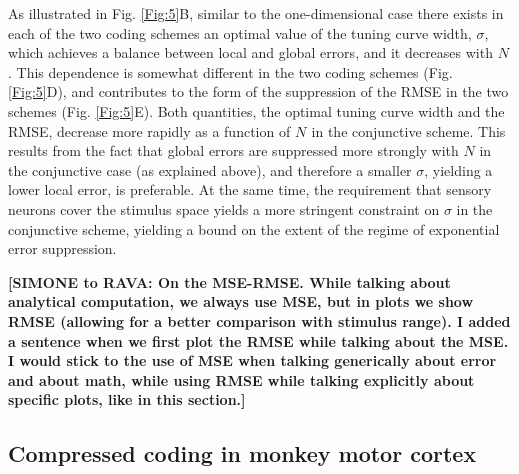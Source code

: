 \documentclass[a4paper]{article}%
\begin{document}
As illustrated in Fig. \ref{Fig:5}B, similar to the one-dimensional case there
exists in each of the two coding schemes an optimal value of the tuning curve
width, $\sigma$, which achieves a balance between local and global errors, and
it decreases with $N$. This dependence is somewhat different in the two coding
schemes (Fig. \ref{Fig:5}D), and contributes to the form of the suppression of
the RMSE in the two schemes (Fig. \ref{Fig:5}E). Both quantities, the optimal
tuning curve width and the RMSE, decrease more rapidly as a function of
$N\,\ $in the conjunctive scheme. This results from the fact that global errors
are suppressed more strongly with \thinspace$N$ in the conjunctive case (as
explained above), and therefore a smaller $\sigma$, yielding a lower local
error, is preferable. At the same time, the requirement that sensory neurons
cover the stimulus space yields a more stringent constraint on $\sigma$ in the
conjunctive scheme, yielding a bound on the extent of the regime of
exponential error suppression. 

\textbf{[SIMONE to RAVA: On the MSE-RMSE. While talking about analytical computation, we always use MSE, but in plots we show RMSE (allowing for a better comparison with stimulus range). I added a sentence when we first plot the RMSE while talking about the MSE. I would stick to the use of MSE when talking generically about error and about math, while using RMSE while talking explicitly about specific plots, like in this section.]}

\subsection*{Compressed coding in monkey motor cortex}

\label{Sec:data}
\end{document}
